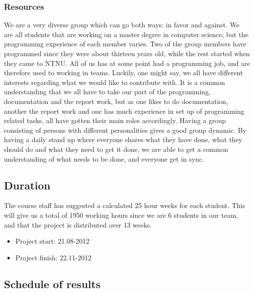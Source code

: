 \subsubsection{Resources}
We are a very diverse group which can go both ways: in favor and against. We are all students that are working on a master degree in computer science, but the programming experience of each member varies. Two of the group members have
programmed since they were about thirteen years old, while the rest started when they came to NTNU. All of us has at some point had a programming job, and are therefore used to working in teams.
\newline
\newline
Luckily, one might say, we all have different interests regarding what we would like to contribute with. It is a common understanding that we all have to take our part of the programming, documentation and the report work, but as one likes to do documentation, another the report work and one has much experience in set up of programming related tasks, all have gotten their main roles accordingly.
\newline
\newline
Having a group consisting of persons with different personalities gives a good group dynamic. By having a daily stand up where everyone shares what they have done, what they should do and what they need to get it done, we are able to get a common understanding of what needs to be done, and everyone get in sync. 

\subsection{Duration}
The course staff has suggested a calculated 25 hour weeks for each student. This will give us a total of 1950 working hours since we are 6 students in our team, and that the project is distributed over 13 weeks.

\begin{itemize}
\item{}Project start: 21.08-2012
\item{}Project finish: 22.11-2012
\end{itemize}

\subsection{Schedule of results}


